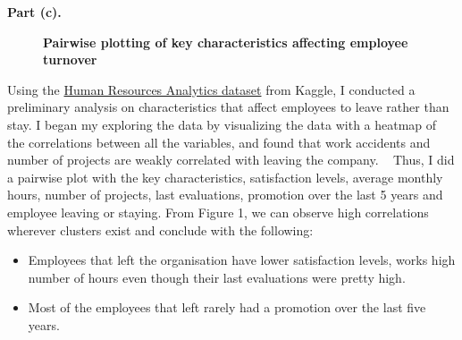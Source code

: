 \documentclass[letterpaper,12pt]{article}
\theoremstyle{definition}
\begin{document}
\newpage 
\flushleft 
\textbf{Part (c).}
\flushleft 
\begin{figure}[htb]\centering\captionsetup{width=4.0in}
  \caption{\textbf{Pairwise plotting of key characteristics affecting employee turnover}}\label{FigExample}
\end{figure}
\flushleft
Using the \href{https://www.kaggle.com/ludobenistant/hr-analytics}{Human Resources Analytics dataset} from Kaggle, I conducted a preliminary analysis on characteristics that affect employees to leave rather than stay. I began my exploring the data by visualizing the data with a heatmap of the correlations between all the variables, and found that  work accidents and number of projects are weakly correlated with leaving the company. \
\flushleft 
Thus, I did a pairwise plot with the key characteristics, satisfaction levels, average monthly hours, number of projects, last evaluations, promotion over the last 5 years and employee leaving or staying. From Figure 1, we can observe high correlations wherever clusters exist and conclude with the following:
\begin{itemize}
  \item Employees that left the organisation have lower satisfaction levels, works high number of hours even though their last evaluations were pretty high.
  \item Most of the employees that left rarely had a promotion over the last five years.
\end{itemize}
 
\end{document}
